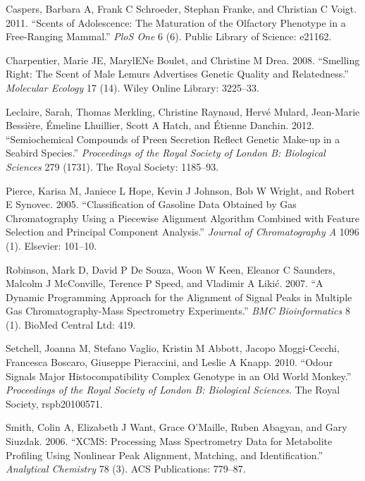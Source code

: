 \documentclass[]{article}
\begin{document}
\hypertarget{refs}{}
\hypertarget{ref-caspers2011scents}{}
Caspers, Barbara A, Frank C Schroeder, Stephan Franke, and Christian C
Voigt. 2011. ``Scents of Adolescence: The Maturation of the Olfactory
Phenotype in a Free-Ranging Mammal.'' \emph{PloS One} 6 (6). Public
Library of Science: e21162.

\hypertarget{ref-charpentier2008smelling}{}
Charpentier, Marie JE, MarylENe Boulet, and Christine M Drea. 2008.
``Smelling Right: The Scent of Male Lemurs Advertises Genetic Quality
and Relatedness.'' \emph{Molecular Ecology} 17 (14). Wiley Online
Library: 3225--33.

\hypertarget{ref-leclaire2012semiochemical}{}
Leclaire, Sarah, Thomas Merkling, Christine Raynaud, Hervé Mulard,
Jean-Marie Bessière, Émeline Lhuillier, Scott A Hatch, and Étienne
Danchin. 2012. ``Semiochemical Compounds of Preen Secretion Reflect
Genetic Make-up in a Seabird Species.'' \emph{Proceedings of the Royal
Society of London B: Biological Sciences} 279 (1731). The Royal Society:
1185--93.

\hypertarget{ref-pierce2005classification}{}
Pierce, Karisa M, Janiece L Hope, Kevin J Johnson, Bob W Wright, and
Robert E Synovec. 2005. ``Classification of Gasoline Data Obtained by
Gas Chromatography Using a Piecewise Alignment Algorithm Combined with
Feature Selection and Principal Component Analysis.'' \emph{Journal of
Chromatography A} 1096 (1). Elsevier: 101--10.

\hypertarget{ref-robinson2007dynamic}{}
Robinson, Mark D, David P De Souza, Woon W Keen, Eleanor C Saunders,
Malcolm J McConville, Terence P Speed, and Vladimir A Likić. 2007. ``A
Dynamic Programming Approach for the Alignment of Signal Peaks in
Multiple Gas Chromatography-Mass Spectrometry Experiments.'' \emph{BMC
Bioinformatics} 8 (1). BioMed Central Ltd: 419.

\hypertarget{ref-setchell2010odour}{}
Setchell, Joanna M, Stefano Vaglio, Kristin M Abbott, Jacopo
Moggi-Cecchi, Francesca Boscaro, Giuseppe Pieraccini, and Leslie A
Knapp. 2010. ``Odour Signals Major Histocompatibility Complex Genotype
in an Old World Monkey.'' \emph{Proceedings of the Royal Society of
London B: Biological Sciences}. The Royal Society, rspb20100571.

\hypertarget{ref-smith2006xcms}{}
Smith, Colin A, Elizabeth J Want, Grace O'Maille, Ruben Abagyan, and
Gary Siuzdak. 2006. ``XCMS: Processing Mass Spectrometry Data for
Metabolite Profiling Using Nonlinear Peak Alignment, Matching, and
Identification.'' \emph{Analytical Chemistry} 78 (3). ACS Publications:
779--87.
\end{document}
